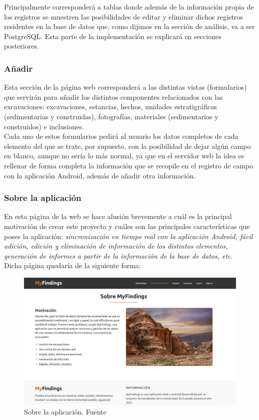     Principalmente corresponderá a tablas donde además de la información propia
    de los registros se muestren las posibilidades de editar y eliminar dichos registros
    residentes en la base de datos que, como dijimos en la sección de análisis, va a ser
    PostgreSQL. Esta parte de la implementación se explicará en secciones posteriores.

    \subsubsection{Añadir}
    Esta sección de la página web corresponderá a las distintas vistas (formularios) que
    servirán para añadir los distintos componentes relacionados con las excavaciones:
    excavaciones, estancias, hechos, unidades estratigráficas (sedimentarias y construidas),
    fotografías, materiales (sedimentarios y construidos) e inclusiones.\\

    Cada uno de estos formularios pedirá al usuario los datos completos de cada elemento del
    que se trate, por supuesto, con la posibilidad de dejar algún campo en blanco, aunque
    no sería lo más normal, ya que en el servidor web la idea es rellenar de forma completa
    la información que se recopile en el registro de campo con la aplicación Android, además
    de añadir otra información.

    \subsubsection{Sobre la aplicación}
    En esta página de la web se hace alusión brevemente a cuál es la principal motivación
    de crear este proyecto y cuáles son las principales características que posee la
    aplicación: \textit{sincronización en tiempo real con la aplicación Android, fácil
    adición, edición y eliminación de información de los distintos elementos, generación
    de informes a partir de la información de la base de datos, etc}.\\

    Dicha página quedaría de la siguiente forma:
        
        \begin{figure}[H]
            \centering
            \includegraphics[scale=0.20]{imagenes/about.png}
            \caption[Sobre la aplicación]{Sobre la aplicación. Fuente \cite{petra-ad-deir}}
            \label{fig:about}
        \end{figure}


